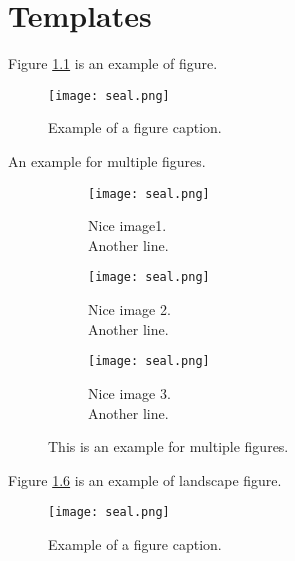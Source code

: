 \chapter{Templates}


\begin{tempsection}
    Figure \ref{fig} is an example of figure.
    \begin{figure}[htbp]
        \centerline{\texttt{[image: seal.png]}}
        \caption{Example of a figure caption.}
        \label{fig}
    \end{figure}

    An example for multiple figures.
    \begin{figure}[htbp]
        \centering
        \begin{subfigure}{0.31\columnwidth}
            \centering
            \texttt{[image: seal.png]}
            \caption{Nice image1. \\ Another line.}
            \label{fig:multiple_figures_a}
        \end{subfigure}
        \begin{subfigure}{0.31\columnwidth}
            \centering
            \texttt{[image: seal.png]}
            \caption{Nice image 2. \\ Another line.}
            \label{fig:multiple_figures_b}
        \end{subfigure}
        \begin{subfigure}{0.31\columnwidth}
            \centering
            \texttt{[image: seal.png]}
            \caption{Nice image 3. \\ Another line.}
            \label{fig:multiple_figures_c}
        \end{subfigure}
        \caption{This is an example for multiple figures.}
        \label{fig:multiple_figures}
    \end{figure}

    Figure \ref{fig2} is an example of landscape figure.
    \begin{landscape}
    \begin{figure}[htbp]
        \centerline{\texttt{[image: seal.png]}}
        \caption{Example of a figure caption.}
        \label{fig2}
    \end{figure}
    \end{landscape}


\end{tempsection}
